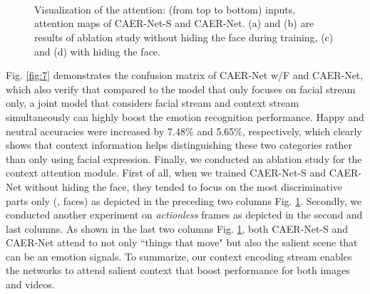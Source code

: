 \documentclass[10pt,twocolumn,letterpaper]{article}
\newcommand{\figref}[1]{Fig. \ref{#1}}
\begin{document}
\begin{figure}
	\centering
	\renewcommand{\thesubfigure}{}
	\hfill
	\hfill
	\hfill
	\hfill\\
    \vspace{-10pt}
	\hfill
	\hfill
	\hfill
	\hfill\\
    \vspace{-10pt}
	\hfill
	\hfill
	\hfill
	\hfill\\
	\vspace{-3pt}
	\caption{Visualization of the attention: (from top to bottom) inputs, attention maps of CAER-Net-S and CAER-Net. (a) and (b) are results of ablation study without hiding the face during training, (c) and (d) with hiding the face.}
	\label{fig:10}\vspace{-10pt}
\end{figure}

\figref{fig:7} demonstrates the confusion matrix of CAER-Net w/F and CAER-Net, which also verify that compared to the model that only focuses on facial stream only, a joint model that considers facial stream and context stream simultaneously can highly boost the emotion recognition performance. Happy and neutral accuracies were increased by 7.48\% and 5.65\%, respectively, which clearly shows that context information helps distinguishing these two categories rather than only using facial expression.
Finally, we conducted an ablation study for the context attention module. First of all, when we trained CAER-Net-S and CAER-Net without hiding the face, they tended to focus on the most discriminative parts only (\ie, faces) as depicted in the preceding two columns \figref{fig:10}. Secondly, we conducted another experiment on \emph{actionless} frames as depicted in the second and last columns. As shown in the last two columns \figref{fig:10}, both CAER-Net-S and CAER-Net attend to not only ``things that move" but also the salient scene that can be an emotion signals.
To summarize, our context encoding stream enables the networks to attend salient context that boost performance for both images and videos.
\end{document}
